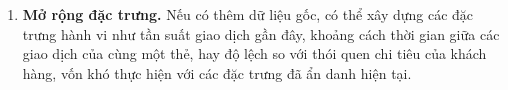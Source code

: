\begin{enumerate}
    \item \textbf{Mở rộng đặc trưng.} Nếu có thêm dữ liệu gốc, có thể xây dựng các đặc trưng hành vi như tần suất giao dịch gần đây, khoảng cách thời gian giữa các giao dịch của cùng một thẻ, hay độ lệch so với thói quen chi tiêu của khách hàng, vốn khó thực hiện với các đặc trưng đã ẩn danh hiện tại.
\end{enumerate}